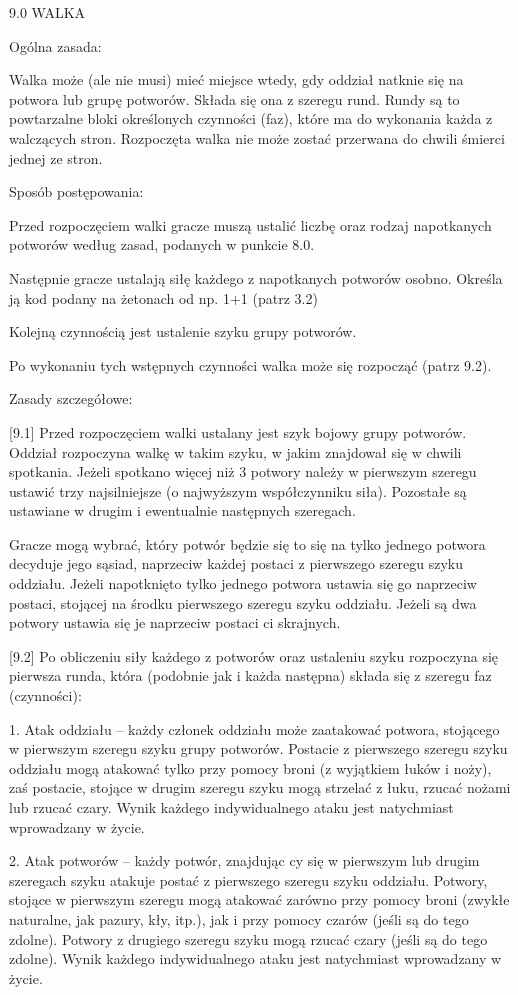 9.0 WALKA

Ogólna zasada:

Walka może (ale nie musi) mieć miejsce wtedy, gdy oddział natknie się na potwora lub grupę potworów.
Składa się ona z szeregu rund.
Rundy są to powtarzalne bloki określonych czynności (faz), które ma do wykonania każda z walczących stron.
Rozpoczęta walka nie może zostać przerwana do chwili śmierci jednej ze stron.

Sposób postępowania:

Przed rozpoczęciem walki gracze muszą ustalić liczbę oraz rodzaj napotkanych potworów według zasad, podanych w punkcie 8.0.

Następnie gracze ustalają siłę każdego z napotkanych potworów osobno.
Określa ją kod podany na żetonach od np. 1+1 (patrz 3.2)

Kolejną czynnością jest ustalenie szyku grupy potworów.

Po wykonaniu tych wstępnych czynności walka może się rozpocząć (patrz 9.2).

Zasady szczegółowe:

[9.1] Przed rozpoczęciem walki ustalany jest szyk bojowy grupy potworów.
Oddział rozpoczyna walkę w takim szyku, w jakim znajdował się w chwili spotkania.
Jeżeli spotkano więcej niż 3 potwory należy w pierwszym szeregu ustawić trzy najsilniejsze (o najwyższym współczynniku siła).
Pozostałe są ustawiane w drugim i ewentualnie następnych szeregach.

Gracze mogą wybrać, który potwór będzie się to się na tylko jednego potwora decyduje jego sąsiad, naprzeciw każdej postaci z pierwszego szeregu szyku oddziału.
Jeżeli napotknięto tylko jednego potwora ustawia się go naprzeciw postaci, stojącej na środku pierwszego szeregu szyku oddziału.
Jeżeli są dwa potwory ustawia się je naprzeciw postaci ci skrajnych.

[9.2] Po obliczeniu siły każdego z potworów oraz ustaleniu szyku rozpoczyna się pierwsza runda, która (podobnie jak i każda następna) składa się z szeregu faz (czynności):

1.
Atak oddziału – każdy członek oddziału może zaatakować potwora, stojącego w pierwszym szeregu szyku grupy potworów.
Postacie z pierwszego szeregu szyku oddziału mogą atakować tylko przy pomocy broni (z wyjątkiem łuków i noży), zaś postacie, stojące w drugim szeregu szyku mogą strzelać z łuku, rzucać nożami lub rzucać czary.
Wynik każdego indywidualnego ataku jest natychmiast wprowadzany w życie.

2.
Atak potworów – każdy potwór, znajdując cy się w pierwszym lub drugim szeregach szyku atakuje postać z pierwszego szeregu szyku oddziału.
Potwory, stojące w pierwszym szeregu mogą atakować zarówno przy pomocy broni (zwykłe naturalne, jak pazury, kły, itp.), jak i przy pomocy czarów (jeśli są do tego zdolne).
Potwory z drugiego szeregu szyku mogą rzucać czary (jeśli są do tego zdolne).
Wynik każdego indywidualnego ataku jest natychmiast wprowadzany w życie.

